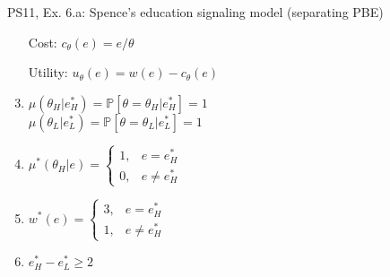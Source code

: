 \begin{frame}{PS11, Ex. 6.a: Spence’s education signaling model (separating PBE)}
\begin{multicols}{2}
\begin{enumerate}
        \item[Cost:] \vspace{-2pt}$c_\theta(e)=e/\theta$
        \item[Utility:] \vspace{-2pt}$u_\theta(e)=w(e)-c_\theta(e)$
        \item \vspace{-2pt}$\mu\left(\theta_H|e_H^*\right)=
               \mathbb{P}\left[\theta=\theta_H|e_H^*\right]=1$\\
              $\mu\left(\theta_L|e_L^*\right)=
               \mathbb{P}\left[\theta=\theta_L|e_L^*\right]=1$
        \item \vspace{-2pt}$\mu^*(\theta_H|e)=\left\{\begin{array}{ll}
                  1, & e = e_H^* \\
                  0, & e \neq e_H^*
               \end{array}\right.$
        \item \vspace{-2pt}$w^*(e)=\left\{\begin{array}{ll}
                  3, & e = e_H^* \\
                  1, & e \neq e_H^*
               \end{array}\right.$
        \item \vspace{-2pt}$e_H^*-e_L^*\geq2$
      \end{enumerate}
    \end{multicols}
    \vfill\null
\end{frame}
